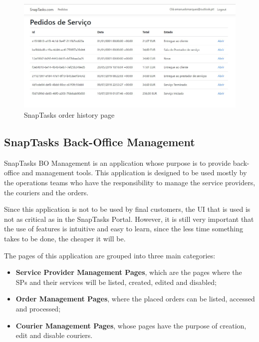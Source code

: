 \begin{figure}[ht]
\centering
\includegraphics[width=\textwidth,keepaspectratio]{chapters/Implementation/assets/snaptasks-orderhistory.jpg}
\caption[SnapTasks order history page]{SnapTasks order history page}
\label{fig:snaptasksOrderHistory}
\end{figure}

\clearpage

\clearpage
\subsection{SnapTasks Back-Office Management}
\label{sub:UI_BOManagement}
SnapTasks BO Management is an application whose purpose is to provide back-office and management tools. This application is designed to be used mostly by the operations teams who have the responsibility to manage the service providers, the couriers and the orders.
\par
Since this application is not to be used by final customers, the \gls{UI} that is used is not as critical as in the SnapTasks Portal. However, it is still very important that the use of features is intuitive and easy to learn, since the less time something takes to be done, the cheaper it will be.

\par

The pages of this application are grouped into three main categories: 

\begin{itemize}
    \item \textbf{Service Provider Management Pages}, which are the pages where the \gls{SP}s and their services will be listed, created, edited and disabled;
    \item \textbf{Order Management Pages}, where the placed orders can be listed, accessed and processed;
    \item \textbf{Courier Management Pages}, whose pages have the purpose of creation, edit and disable couriers.
\end{itemize}

